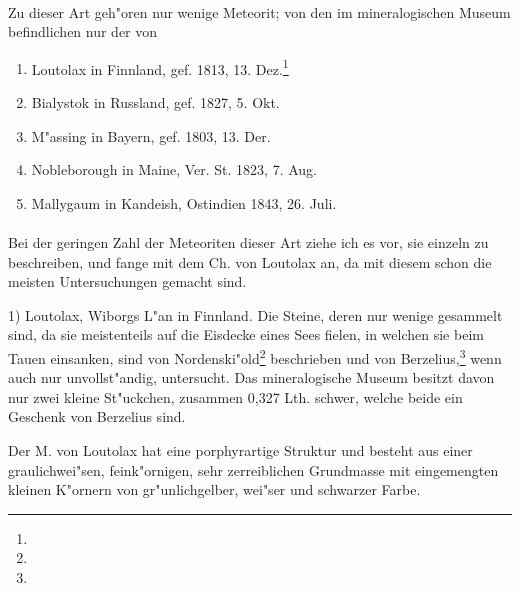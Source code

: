 \documentclass[a4paper, 11pt, oneside]{article}
\begin{document}
\paragraph{}
Zu dieser Art geh"oren nur wenige Meteorit; von den im mineralogischen Museum befindlichen nur der von
\begin{enumerate}
    \item Loutolax in Finnland, gef. 1813, 13. Dez.\footnote{}
    \item Bialystok in Russland, gef. 1827, 5. Okt.
    \item M"assing in Bayern, gef. 1803, 13. Der.
    \item Nobleborough in Maine, Ver. St. 1823, 7. Aug.
    \item Mallygaum in Kandeish, Ostindien 1843, 26. Juli.
\end{enumerate}
\paragraph{}
Bei der geringen Zahl der Meteoriten dieser Art ziehe ich es vor, sie einzeln zu beschreiben, und fange mit dem Ch. von Loutolax an, da mit diesem schon die meisten Untersuchungen gemacht sind.

1) Loutolax, Wiborgs L"an in Finnland. Die Steine, deren nur wenige gesammelt sind, da sie meistenteils auf die Eisdecke eines Sees fielen, in welchen sie beim Tauen einsanken, sind von Nordenski"old\footnote{} beschrieben und von Berzelius,\footnote{} wenn auch nur unvollst"andig, untersucht. Das mineralogische Museum besitzt davon nur zwei kleine St"uckchen, zusammen 0,327 Lth. schwer, welche beide ein Geschenk von Berzelius sind.

Der M. von Loutolax hat eine porphyrartige Struktur und besteht aus einer graulichwei"sen, feink"ornigen, sehr zerreiblichen Grundmasse mit eingemengten kleinen K"ornern von gr"unlichgelber, wei"ser und schwarzer Farbe.
\end{document}
